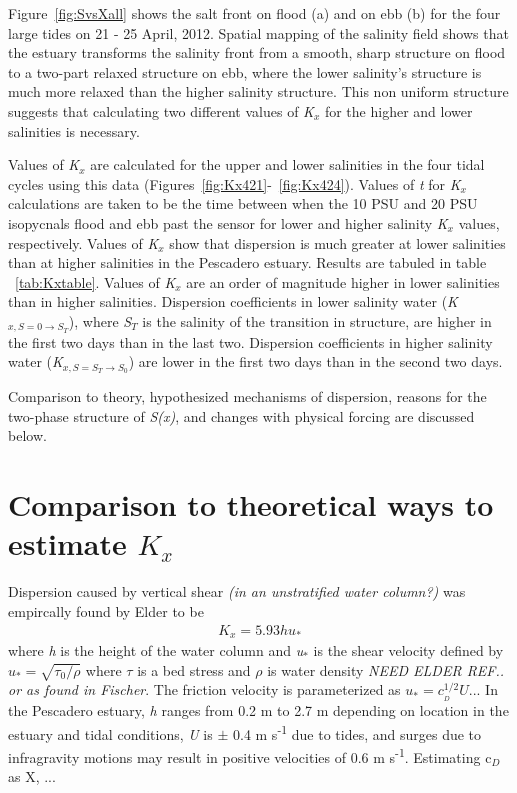 Figure~\ref{fig:SvsXall} shows the salt front on flood (a) and on ebb (b) for the four large tides on 21 - 25 April, 2012. Spatial mapping of the salinity field shows that the estuary transforms  the salinity front from a smooth, sharp structure on flood to a two-part relaxed structure on ebb, where the lower salinity's structure is much more relaxed than the higher salinity structure. This non uniform structure suggests that calculating two different values of \emph{K$_x$} for the higher and lower salinities is necessary.

Values of \emph{K$_x$} are calculated for the upper and lower salinities in the four tidal cycles using this data (Figures~\ref{fig:Kx421}-~\ref{fig:Kx424}). Values of \emph{t} for \emph{K$_x$} calculations are taken to be the time between when the 10 PSU and 20 PSU isopycnals flood and ebb past the sensor for lower and higher salinity \emph{K$_x$} values, respectively. Values of \emph{K$_x$} show that dispersion is much greater at lower salinities than at higher salinities in the Pescadero estuary. Results are tabuled in table ~\ref{tab:Kxtable}. Values of \emph{K$_x$} are an order of magnitude higher in lower salinities than in higher salinities. Dispersion coefficients in lower salinity water (\emph{K$_{x,S=0 \rightarrow S_T}$}), where \emph{S$_T$} is the salinity of the transition in structure, are higher in the first two days than in the last two. Dispersion coefficients in higher salinity water (\emph{K$_{x,S=S_T \rightarrow S_0}$}) are lower in the first two days than in the second two days. 

Comparison to theory, hypothesized mechanisms of dispersion, reasons for the two-phase structure of \emph{S(x)}, and changes with physical forcing are discussed below. 

\section{Comparison to theoretical ways to estimate $K_x$}

Dispersion caused by vertical shear \emph{(in an unstratified water column?)} was empircally found by Elder to be
\begin{eqnarray}
K_x = 5.93hu_* \label{eq:Kshear}
\end{eqnarray}
where \emph{h} is the height of the water column and \emph{u$_*$} is the shear velocity defined by $u_*=\sqrt{\tau_0/\rho}$ where $\tau$ is a bed stress and $\rho$ is water density \emph{NEED ELDER REF.. or as found in Fischer}. The friction velocity is parameterized as $u_* = c_{_D}^{1/2}U$... In the Pescadero estuary, \emph{h} ranges from 0.2 m to 2.7 m depending on location in the estuary and tidal conditions, \emph{U} is $\pm$ 0.4 m s\textsuperscript{-1} due to tides, and surges due to infragravity motions may result in positive velocities of 0.6 m s\textsuperscript{-1}. Estimating c$_D$ as X, ... 

